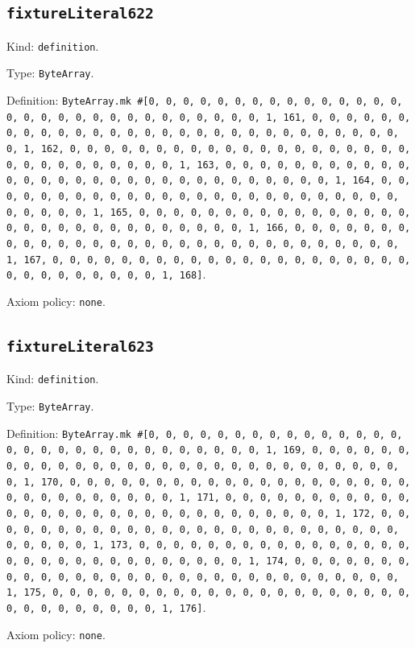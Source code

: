 \documentclass[11pt]{article}
\begin{document}
\subsection*{\texttt{fixtureLiteral622}}
\noindent Kind: \texttt{definition}.\par
\noindent Type: \texttt{ByteArray}.\par
\noindent Definition: \texttt{ByteArray.mk \#[0, 0, 0, 0, 0, 0, 0, 0, 0, 0, 0, 0, 0, 0, 0, 0, 0, 0, 0, 0, 0, 0, 0, 0, 0, 0, 0, 0, 0, 0, 1, 161, 0, 0, 0, 0, 0, 0, 0, 0, 0, 0, 0, 0, 0, 0, 0, 0, 0, 0, 0, 0, 0, 0, 0, 0, 0, 0, 0, 0, 0, 0, 1, 162, 0, 0, 0, 0, 0, 0, 0, 0, 0, 0, 0, 0, 0, 0, 0, 0, 0, 0, 0, 0, 0, 0, 0, 0, 0, 0, 0, 0, 0, 0, 1, 163, 0, 0, 0, 0, 0, 0, 0, 0, 0, 0, 0, 0, 0, 0, 0, 0, 0, 0, 0, 0, 0, 0, 0, 0, 0, 0, 0, 0, 0, 0, 1, 164, 0, 0, 0, 0, 0, 0, 0, 0, 0, 0, 0, 0, 0, 0, 0, 0, 0, 0, 0, 0, 0, 0, 0, 0, 0, 0, 0, 0, 0, 0, 1, 165, 0, 0, 0, 0, 0, 0, 0, 0, 0, 0, 0, 0, 0, 0, 0, 0, 0, 0, 0, 0, 0, 0, 0, 0, 0, 0, 0, 0, 0, 0, 1, 166, 0, 0, 0, 0, 0, 0, 0, 0, 0, 0, 0, 0, 0, 0, 0, 0, 0, 0, 0, 0, 0, 0, 0, 0, 0, 0, 0, 0, 0, 0, 1, 167, 0, 0, 0, 0, 0, 0, 0, 0, 0, 0, 0, 0, 0, 0, 0, 0, 0, 0, 0, 0, 0, 0, 0, 0, 0, 0, 0, 0, 0, 0, 1, 168]}.\par
\noindent Axiom policy: \texttt{none}.\par
\subsection*{\texttt{fixtureLiteral623}}
\noindent Kind: \texttt{definition}.\par
\noindent Type: \texttt{ByteArray}.\par
\noindent Definition: \texttt{ByteArray.mk \#[0, 0, 0, 0, 0, 0, 0, 0, 0, 0, 0, 0, 0, 0, 0, 0, 0, 0, 0, 0, 0, 0, 0, 0, 0, 0, 0, 0, 0, 0, 1, 169, 0, 0, 0, 0, 0, 0, 0, 0, 0, 0, 0, 0, 0, 0, 0, 0, 0, 0, 0, 0, 0, 0, 0, 0, 0, 0, 0, 0, 0, 0, 1, 170, 0, 0, 0, 0, 0, 0, 0, 0, 0, 0, 0, 0, 0, 0, 0, 0, 0, 0, 0, 0, 0, 0, 0, 0, 0, 0, 0, 0, 0, 0, 1, 171, 0, 0, 0, 0, 0, 0, 0, 0, 0, 0, 0, 0, 0, 0, 0, 0, 0, 0, 0, 0, 0, 0, 0, 0, 0, 0, 0, 0, 0, 0, 1, 172, 0, 0, 0, 0, 0, 0, 0, 0, 0, 0, 0, 0, 0, 0, 0, 0, 0, 0, 0, 0, 0, 0, 0, 0, 0, 0, 0, 0, 0, 0, 1, 173, 0, 0, 0, 0, 0, 0, 0, 0, 0, 0, 0, 0, 0, 0, 0, 0, 0, 0, 0, 0, 0, 0, 0, 0, 0, 0, 0, 0, 0, 0, 1, 174, 0, 0, 0, 0, 0, 0, 0, 0, 0, 0, 0, 0, 0, 0, 0, 0, 0, 0, 0, 0, 0, 0, 0, 0, 0, 0, 0, 0, 0, 0, 1, 175, 0, 0, 0, 0, 0, 0, 0, 0, 0, 0, 0, 0, 0, 0, 0, 0, 0, 0, 0, 0, 0, 0, 0, 0, 0, 0, 0, 0, 0, 0, 1, 176]}.\par
\noindent Axiom policy: \texttt{none}.\par
\end{document}

